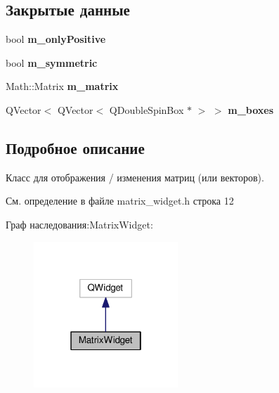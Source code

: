 \subsection*{Закрытые данные}
\begin{DoxyCompactItemize}
\item 
bool {\bfseries m\+\_\+only\+Positive}\hypertarget{class_matrix_widget_a82f2f645dfe6a61844cbcaa7b9d74c5f}{}\label{class_matrix_widget_a82f2f645dfe6a61844cbcaa7b9d74c5f}

\item 
bool {\bfseries m\+\_\+symmetric}\hypertarget{class_matrix_widget_ad3c5c9a7eb76b52d92ff88e5aac69df8}{}\label{class_matrix_widget_ad3c5c9a7eb76b52d92ff88e5aac69df8}

\item 
Math\+::\+Matrix {\bfseries m\+\_\+matrix}\hypertarget{class_matrix_widget_a45e4733316b0de574c8f333e3f89bd4c}{}\label{class_matrix_widget_a45e4733316b0de574c8f333e3f89bd4c}

\item 
Q\+Vector$<$ Q\+Vector$<$ Q\+Double\+Spin\+Box $\ast$ $>$ $>$ {\bfseries m\+\_\+boxes}\hypertarget{class_matrix_widget_ab3a0c3c5c847e0a35aa23a6a7e7d56f6}{}\label{class_matrix_widget_ab3a0c3c5c847e0a35aa23a6a7e7d56f6}

\end{DoxyCompactItemize}


\subsection{Подробное описание}
Класс для отображения / изменения матриц (или векторов). 

См. определение в файле matrix\+\_\+widget.\+h строка 12



Граф наследования\+:Matrix\+Widget\+:
\nopagebreak
\begin{figure}[H]
\begin{center}
\leavevmode
\includegraphics[width=154pt]{class_matrix_widget__inherit__graph}
\end{center}
\end{figure}



